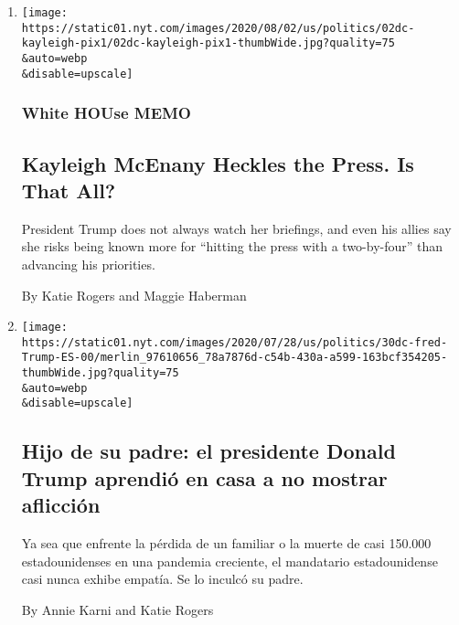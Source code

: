 \begin{enumerate}
\def\labelenumi{\arabic{enumi}.}
\item
  \href{/2020/08/02/us/politics/kayleigh-mcenany.html}{}

  \texttt{[image: https://static01.nyt.com/images/2020/08/02/us/politics/02dc-kayleigh-pix1/02dc-kayleigh-pix1-thumbWide.jpg?quality=75\\\&auto=webp\\\&disable=upscale]}

  \hypertarget{white-house-memo}{%
  \subsubsection{White HOUse MEMO}\label{white-house-memo}}

  \hypertarget{kayleigh-mcenany-heckles-the-press-is-that-all}{%
  \subsection{Kayleigh McEnany Heckles the Press. Is That
  All?}\label{kayleigh-mcenany-heckles-the-press-is-that-all}}

  President Trump does not always watch her briefings, and even his
  allies say she risks being known more for ``hitting the press with a
  two-by-four'' than advancing his priorities.

  By Katie Rogers and Maggie Haberman
\item
  \href{/es/2020/07/31/espanol/estados-unidos/fred-trump-donald-trump.html}{}

  \texttt{[image: https://static01.nyt.com/images/2020/07/28/us/politics/30dc-fred-Trump-ES-00/merlin\_97610656\_78a7876d-c54b-430a-a599-163bcf354205-thumbWide.jpg?quality=75\\\&auto=webp\\\&disable=upscale]}

  \hypertarget{hijo-de-su-padre-el-presidente-donald-trump-aprendiuxf3-en-casa-a-no-mostrar-aflicciuxf3n}{%
  \subsection{Hijo de su padre: el presidente Donald Trump aprendió en
  casa a no mostrar
  aflicción}\label{hijo-de-su-padre-el-presidente-donald-trump-aprendiuxf3-en-casa-a-no-mostrar-aflicciuxf3n}}

  Ya sea que enfrente la pérdida de un familiar o la muerte de casi
  150.000 estadounidenses en una pandemia creciente, el mandatario
  estadounidense casi nunca exhibe empatía. Se lo inculcó su padre.

  By Annie Karni and Katie Rogers


\end{enumerate}
